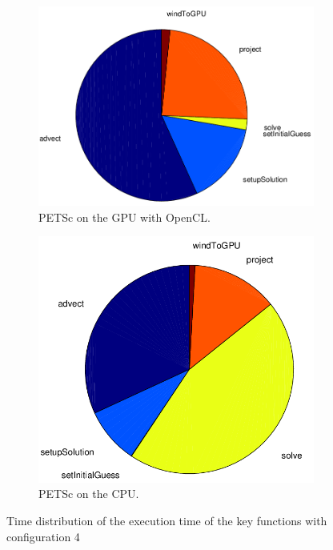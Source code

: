 \begin{figure}[ht]
	\center
	
	\begin{subfigure}{0.45\textwidth}
		\center
		\includegraphics[width=1.0\textwidth]{results/data/td_conf4_petsc_gpu}
		\caption{PETSc on the GPU with OpenCL.}
		\label{fig:td_conf4_petsc_gpu}
	\end{subfigure}
	\begin{subfigure}{0.45\textwidth}
		\center
		\includegraphics[width=1.0\textwidth]{results/data/td_conf4_petsc_cpu}
		\caption{PETSc on the CPU.}
		\label{fig:td_conf4_petsc_cpu}
	\end{subfigure}
	\caption{Time distribution of the execution time of the key functions
			with configuration 4}
	\label{fig:td_conf4}
	
\end{figure}

